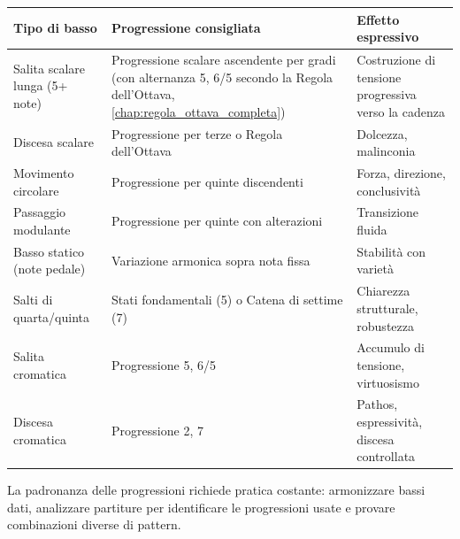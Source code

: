 \begin{regola}
	\label{reg:scelta_progressioni}
	
	\begin{tabular}{|p{4.5cm}|p{4.5cm}|p{4.5cm}|}
		\hline
		\textbf{Tipo di basso} & \textbf{Progressione consigliata} & \textbf{Effetto espressivo} \\
		\hline
		Salita scalare lunga (5+ note) & Progressione scalare ascendente per gradi (con alternanza 5, 6/5 secondo la Regola dell'Ottava, \ref{chap:regola_ottava_completa}) \footnotemark & Costruzione di tensione progressiva verso la cadenza \\
		\hline

		Discesa scalare & Progressione per terze o Regola dell'Ottava & Dolcezza, malinconia \\
		\hline
		Movimento circolare & Progressione per quinte discendenti & Forza, direzione, conclusività \\
		\hline
		Passaggio modulante & Progressione per quinte con alterazioni & Transizione fluida \\
		\hline
		Basso statico (note pedale) & Variazione armonica sopra nota fissa & Stabilità con varietà \\
		\hline
		Salti di quarta/quinta & Stati fondamentali (5) o Catena di settime (7) & Chiarezza strutturale, robustezza \\
		\hline
		Salita cromatica & Progressione 5, 6/5 & Accumulo di tensione, virtuosismo \\
		\hline
		Discesa cromatica & Progressione 2, 7 & Pathos, espressività, discesa controllata \\
		\hline
	\end{tabular}
\end{regola}

\vspace{1cm}

La padronanza delle progressioni richiede pratica costante: armonizzare bassi dati, analizzare partiture per identificare le progressioni usate e provare combinazioni diverse di pattern.

